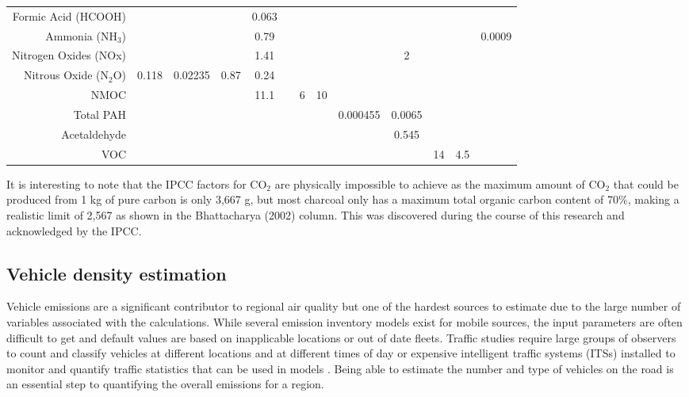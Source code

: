 \begin{sidewaystable}
\begin{table}[H]
{\begin{tabular}{@{}rcccccccccccc@{}}
Formic Acid (HCOOH) &  &  &  & 0.063 &  &  &  &  &  &  &  &  \\
Ammonia (NH$_{3}$) &  &  &  & 0.79 &  &  &  &  &  &  &  & 0.0009 \\
Nitrogen Oxides (NOx) &  &  &  & 1.41 &  &  &  &  & 2 &  &  &  \\
Nitrous Oxide (N$_{2}$O) & 0.118 & 0.02235 & 0.87 & 0.24 &  &  &  &  &  &  &  &  \\
NMOC &  &  &  & 11.1 &  & 6 & 10 &  &  &  &  &  \\
Total PAH &  &  &  &  &  &  &  & 0.000455 & 0.0065 &  &  &  \\
Acetaldehyde &  &  &  &  &  &  &  &  & 0.545 &  &  &  \\
VOC &  &  &  &  &  &  &  &  &  & 14 & 4.5 &  \\ \bottomrule
\end{tabular}
} %
\end{table}	 
\end{sidewaystable}

It is interesting to note that the IPCC factors for CO$_{2}$ are physically impossible to achieve as the maximum amount of CO$_{2}$ that could be produced from 1 kg of pure carbon is only 3,667 g, but most charcoal only has a maximum total organic carbon content of 70\%, making a realistic limit of 2,567 as shown in the Bhattacharya (2002) column.  This was discovered during the course of this research and acknowledged by the IPCC.
\clearpage
\subsection{Vehicle density estimation}

Vehicle emissions are a significant contributor to regional air quality but one of the hardest sources to estimate due to the large number of variables associated with the calculations. While several emission inventory models exist for mobile sources, the input parameters are often  difficult to get and default values are based on inapplicable locations or out of date fleets. Traffic studies require large groups of observers to count and classify vehicles at different locations and at different times of day or expensive intelligent traffic systems (ITSs) installed to monitor and quantify traffic statistics that can be used in models \citep{Suzuki2015}. Being able to estimate the number and type of vehicles on the road is an essential step to quantifying the overall emissions for a region. 

